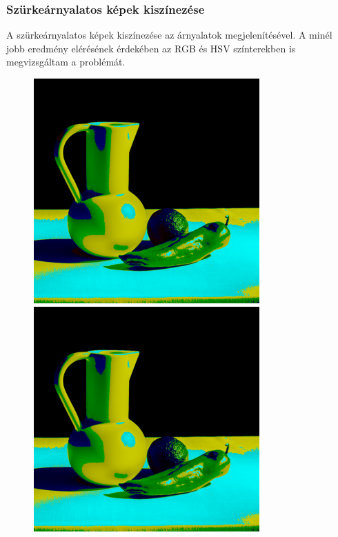 \documentclass{beamer}
\begin{document}
\begin{frame}[fragile]
\frametitle{Szürkeárnyalatos képek kiszínezése}
A szürkeárnyalatos képek kiszínezése az árnyalatok megjelenítésével. A minél jobb eredmény elérésének érdekében az RGB és HSV színterekben is megvizsgáltam a problémát.
\begin{figure}[!tbp]
  \centering
  \begin{minipage}[b]{0.45\textwidth}
    \includegraphics[width=\textwidth]{images/colorized_rgb.png}
  \end{minipage}
  \hfill
  \begin{minipage}[b]{0.45\textwidth}
    \includegraphics[width=\textwidth]{images/colorized_hsv.png}
  \end{minipage}
\end{figure}
\end{frame}
\end{document}
